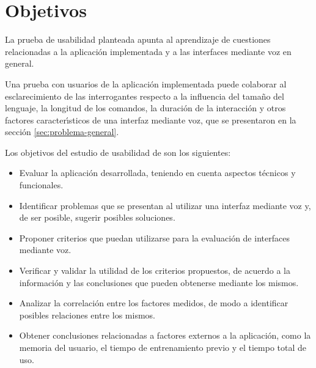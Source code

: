 \section{Objetivos}
\label{sec:objetivos-estudio}

La prueba de usabilidad planteada apunta al aprendizaje de cuestiones relacionadas
a la aplicaci\'on implementada y a las interfaces mediante voz en general.

Una prueba con usuarios de la aplicaci\'on implementada puede colaborar al esclarecimiento de 
las interrogantes respecto a la influencia del tama\~no del lenguaje, la longitud de
los comandos, la duraci\'on de la interacci\'on y otros factores caracter{\'\i}sticos de una
interfaz mediante voz, que se presentaron en la secci\'on \ref{sec:problema-general}.

Los objetivos del estudio de usabilidad de  son los siguientes:

\begin{itemize}
	\item Evaluar la aplicaci\'on desarrollada, teniendo en cuenta 
	aspectos t\'ecnicos y funcionales.
	\item Identificar problemas que se presentan al utilizar una interfaz mediante voz y,
	 de ser posible, sugerir posibles soluciones.
	\item Proponer criterios que puedan utilizarse para la evaluaci\'on de interfaces 
	mediante voz.
	\item Verificar y validar la utilidad de los criterios propuestos, de acuerdo a 
	la informaci\'on y las conclusiones que pueden obtenerse mediante los mismos.
	\item Analizar la correlaci\'on entre los factores medidos, de modo a identificar
	posibles relaciones entre los mismos. 
	\item Obtener conclusiones relacionadas a factores externos a la aplicaci\'on, 
	como la memoria del usuario, el tiempo de entrenamiento previo y el tiempo
	total de uso.
\end{itemize}